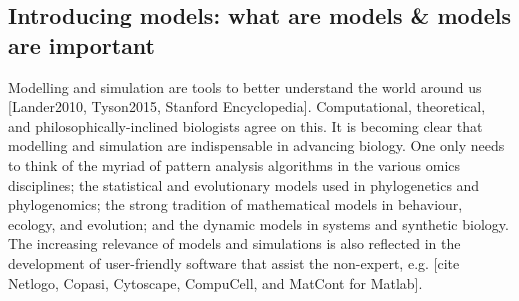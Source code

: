 \subsection{Introducing models: what are models & models are important}

Modelling and simulation are tools to better understand the world around us [Lander2010, Tyson2015, Stanford Encyclopedia]. Computational, theoretical, and philosophically-inclined biologists agree on this.  It is becoming clear that modelling and simulation are indispensable in advancing biology. One only needs to think of the myriad of pattern analysis algorithms in the various omics disciplines; the statistical and evolutionary models used in phylogenetics and phylogenomics; the strong tradition of mathematical models in behaviour, ecology, and evolution; and the dynamic models in systems and synthetic biology. The increasing relevance of models and simulations is also reflected in the development of user-friendly software that assist the non-expert, e.g. [cite Netlogo, Copasi, Cytoscape, CompuCell, and MatCont for Matlab].

  